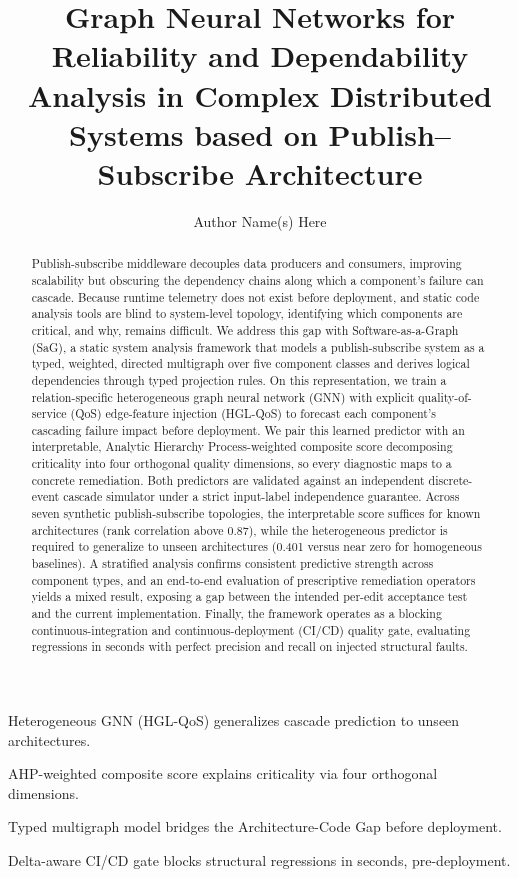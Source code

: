 \documentclass[review]{elsarticle}
\begin{document}
\begin{frontmatter}

\title{Graph Neural Networks for Reliability and Dependability Analysis in Complex Distributed Systems based on Publish--Subscribe Architecture}

\author{Author Name(s) Here}
\address{Affiliation Here}

\begin{abstract}
Publish-subscribe middleware decouples data producers and consumers, improving scalability but
obscuring the dependency chains along which a component's failure can cascade. Because runtime
telemetry does not exist before deployment, and static code analysis tools are blind to
system-level topology, identifying which components are critical, and why, remains difficult. We
address this gap with Software-as-a-Graph (SaG), a static system analysis framework that models a
publish-subscribe system as a typed, weighted, directed multigraph over five component classes and
derives logical dependencies through typed projection rules. On this representation, we train a
relation-specific heterogeneous graph neural network (GNN) with explicit quality-of-service (QoS)
edge-feature injection (HGL-QoS) to forecast each component's cascading failure impact before
deployment. We pair this learned predictor with an interpretable, Analytic Hierarchy
Process-weighted composite score decomposing criticality into four orthogonal quality dimensions,
so every diagnostic maps to a concrete remediation. Both predictors are validated against an
independent discrete-event cascade simulator under a strict input-label independence guarantee.
Across seven synthetic publish-subscribe topologies, the interpretable score suffices for known
architectures (rank correlation above 0.87), while the heterogeneous predictor is required to
generalize to unseen architectures (0.401 versus near zero for homogeneous baselines). A stratified
analysis confirms consistent predictive strength across component types, and an end-to-end
evaluation of prescriptive remediation operators yields a mixed result, exposing a gap between the
intended per-edit acceptance test and the current implementation. Finally, the framework operates
as a blocking continuous-integration and continuous-deployment (CI/CD) quality gate, evaluating
regressions in seconds with perfect precision and recall on injected structural faults.
\end{abstract}

\begin{highlights}
\item Heterogeneous GNN (HGL-QoS) generalizes cascade prediction to unseen architectures.
\item AHP-weighted composite score explains criticality via four orthogonal dimensions.
\item Typed multigraph model bridges the Architecture-Code Gap before deployment.
\item Delta-aware CI/CD gate blocks structural regressions in seconds, pre-deployment.
\end{highlights}


\end{frontmatter}
\end{document}
